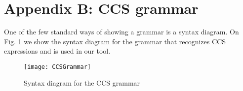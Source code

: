 \section*{Appendix B: CCS grammar}
\label{appendixB}

One of the few standard ways of showing a grammar is a syntax diagram. On Fig. \ref{fig:CCSGrammar} we show the syntax diagram
for the grammar that recognizes CCS expressions and is used in our tool.

\begin{figure}
\centering
\texttt{[image: CCSGrammar]}
\caption{Syntax diagram for the CCS grammar}
\label{fig:CCSGrammar}
\end{figure}
